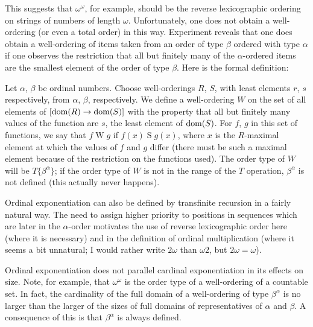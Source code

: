 This suggests that $\omega^\omega$, for example, should be the
reverse lexicographic ordering on strings of numbers of length
$\omega$.  Unfortunately, one does not obtain a
well-ordering (or even a total order) in this way.
Experiment reveals that one does obtain a 
well-ordering of items taken from an order of type $\beta$ ordered
with type $\alpha$ if one observes the restriction that all but
finitely many of the $\alpha$-ordered items are the smallest element
of the order of type $\beta$.  Here is the formal definition:

\begin{definition}
 Let $\alpha$, $\beta$ be ordinal numbers.  Choose
 well-orderings $R$, $S$, with least elements $r$, $s$
 respectively, 
 from $\alpha$, $\beta$, respectively.  We define a well-ordering $W$
 on the set of all elements of $[\mathop{\mathrm{dom}}(R) \rightarrow  \mathop{\mathrm{dom}}(S)]$
 with the property that all but finitely many values of the
 function 
 are $s$, the least element of $\mathop{\mathrm{dom}}(S)$.  For $f$, $g$ in this set of
 functions, we say that $f\mathrel{W} g$ if $f(x)\mathrel{S} g(x)$, where $x$
 is the
 $R$-maximal element at which the values of $f$ and $g$ differ (there
 must be such a maximal element because of the restriction on the
 functions used).  The order type of $W$ will be
 $T\{\beta^\alpha\}$; 
 if the order type of $W$ is not in the range of the $T$ operation,
 $\beta^\alpha$ is not defined (this actually never happens).
\end{definition}

Ordinal exponentiation can also be defined by
transfinite recursion in a fairly natural way.
The need to assign higher priority to positions in
sequences which are later in the $\alpha$-order
motivates the use of reverse lexicographic order here (where it is necessary)
and in the definition of ordinal multiplication (where it seems a bit unnatural; 
I would rather write $2\omega$ than $\omega2$, but $2\omega=\omega$).

Ordinal exponentiation does not parallel cardinal
exponentiation in 
its effects on size.  Note, for example, that $\omega^\omega$ is the
order type of a well-ordering of a
countable set.  In fact, the 
cardinality of the full domain of a well-ordering of type
$\beta^\alpha$ is no larger than the larger of the sizes of full
domains of representatives of $\alpha$ and $\beta$.  A consequence of
this is that $\beta^\alpha$ is always defined.


